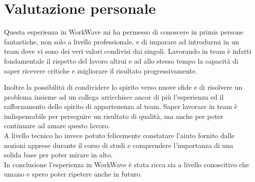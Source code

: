 \section{Valutazione personale}

Questa esperienza in WorkWave mi ha permesso di conoscere in primis persone fantastiche, non solo a livello professionale, e di imparare ad introdurmi in un team dove vi sono dei veri valori condivisi dai singoli. Lavorando in team è infatti fondamentale il rispetto del lavoro altrui e ad allo stesso tempo la capacità di saper ricevere critiche e migliorare il risultato progressivamente.

Inoltre la possibilità di condividere lo spirito verso nuove sfide e di risolvere un problema insieme ad un collega arricchisce ancor di più l'esperienza ed il rafforzamento dello spirito di appartenenza al team. Saper lavorare in team è indispensabile per perseguire un risultato di qualità, ma anche per poter continuare ad amare questo lavoro. \\

A livello tecnico ho invece potuto felicemente constatare l'aiuto fornito dalle nozioni apprese durante il corso di studi e comprendere l'importanza di una solida base per poter mirare in alto. \\

In conclusione l'esperienza in WorkWave è stata ricca sia a livello conoscitivo che umano e spero poter ripetere anche in futuro.
